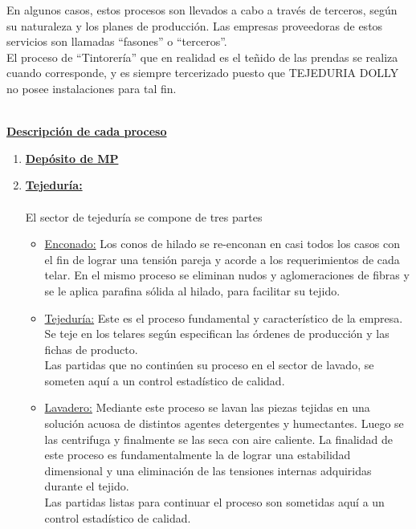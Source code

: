 \documentclass[a4paper,10pt,titlepage]{article}
\begin{document}
		\indent En algunos casos, estos procesos son llevados a cabo a trav\'es de terceros, seg\'un su naturaleza y los planes de producci\'on. Las empresas proveedoras de estos servicios son llamadas ``fasones'' o ``terceros''.\\
		\indent El proceso de ``Tintorer\'ia'' que en realidad es el teñido de las prendas se realiza cuando corresponde, y es siempre tercerizado puesto que TEJEDURIA DOLLY no posee instalaciones para tal fin.\\ \\
			\begin{center}\textbf{\underline{Descripci\'on de cada proceso}}\end{center}
			\begin{enumerate}
			\item \textbf{\underline{Dep\'osito de MP}}
			\item  \textbf{\underline{Tejedur\'ia:}}\\\\
			\indent El sector de tejedur\'ia se compone de tres partes\\
				\begin{itemize}
				\item \underline{Enconado:} Los conos de hilado se re-enconan en casi todos los casos con el fin de lograr una tensi\'on pareja y acorde a los requerimientos de cada telar. En el mismo proceso se eliminan nudos y aglomeraciones de fibras y se le aplica parafina s\'olida al hilado, para facilitar su tejido.
				\item \underline{Tejedur\'ia:} Este es el proceso fundamental y caracter\'istico de la empresa. Se teje en los telares seg\'un especifican las \'ordenes de producci\'on y las fichas de producto.\\
				\indent Las partidas que no contin\'uen su proceso en el sector de lavado, se someten aqu\'i a un control estad\'istico de calidad.\\
				\item \underline{Lavadero:} Mediante este proceso se lavan las piezas tejidas en una soluci\'on acuosa de distintos agentes detergentes y humectantes. Luego se las centrifuga y finalmente se las seca con aire caliente. La finalidad de este proceso es fundamentalmente la de lograr una estabilidad dimensional y una eliminaci\'on de las tensiones internas adquiridas durante el tejido.\\ 
				\indent Las partidas listas para continuar el proceso son sometidas aqu\'i a un control estad\'istico de calidad.\\

\end{itemize}
\end{enumerate}
\end{document}
